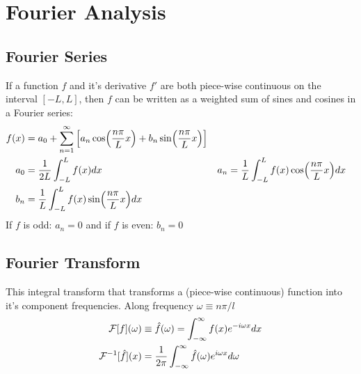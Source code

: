 \section{Fourier Analysis}       
\subsection{Fourier Series}
If a function $f$ and it's derivative $f'$ are both piece-wise continuous on the interval $[-L,L]$, then $f$ can be written as a weighted sum of sines and cosines in a Fourier series:
\begin{align*}
    f(x)
    &=a_0+\sum_{n=1}^\infty \qty[a_n\ft+b_n\ft*]
    \\
    a_0
    &=\oo{2L}\int_{-L}^L f(x)dx
    &
    a_n
    &= \oo{L} \int_{-L}^L f(x)\ft dx
    \\
    b_n
    &= \oo{L} \int_{-L}^L f(x)\ft* dx
\end{align*}
If $f$ is odd: $a_n=0$ and if $f$ is even: $b_n=0$
\subsection{Fourier Transform}
This integral transform that transforms a (piece-wise continuous) function into it's component frequencies. Along frequency $\omega\equiv n\pi/l$
\begin{align*}
    \mathcal{F}[f](\omega)&\equiv\hat{f}(\omega)=\intall f(x)e^{-i\omega x}dx
    \\
    \mathcal{F}^{-1}[\hat{f}](x)&=\oo{2\pi}\intall \hat{f}(\omega)e^{i\omega x}d\omega
\end{align*}
%